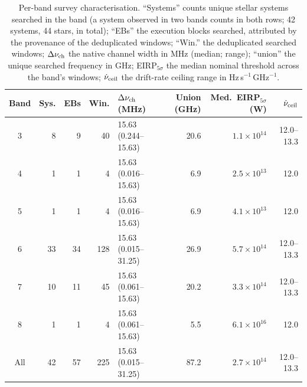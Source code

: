 \documentclass{openjournal}
\begin{document}
\begin{table}
\centering
\small
\setlength{\tabcolsep}{4pt}
\caption{Per-band survey characterisation. ``Systems'' counts unique
stellar systems searched in the band (a system observed in two bands
counts in both rows; 42 systems, 44 stars, in total); ``EBs'' the
execution blocks searched, attributed by the provenance of the
deduplicated windows; ``Win.'' the deduplicated searched windows;
$\Delta\nu_{\rm ch}$ the native channel width in MHz (median; range);
``union'' the unique searched frequency in GHz; EIRP$_{5\sigma}$ the
median nominal threshold across the band's windows; $\dot{\nu}_{\rm
ceil}$ the drift-rate ceiling range in
Hz\,s$^{-1}$\,GHz$^{-1}$.}
\label{tab:bands}
\begin{tabular}{@{}c r r r l r r r@{}}
\hline
Band & Sys. & EBs & Win. & $\Delta\nu_{\rm ch}$ (MHz) & Union (GHz) & Med.\ EIRP$_{5\sigma}$ (W) & $\dot{\nu}_{\rm ceil}$ \\
\hline
3 & 8 & 9 & 40 & 15.63 (0.244--15.63) & 20.6 & $1.1\times10^{14}$ & 12.0--13.3 \\
4 & 1 & 1 & 4 & 15.63 (0.016--15.63) & 6.9 & $2.5\times10^{13}$ & 12.0 \\
5 & 1 & 1 & 4 & 15.63 (0.016--15.63) & 6.9 & $4.1\times10^{13}$ & 12.0 \\
6 & 33 & 34 & 128 & 15.63 (0.015--31.25) & 26.9 & $5.7\times10^{14}$ & 12.0--13.3 \\
7 & 10 & 11 & 45 & 15.63 (0.061--15.63) & 20.2 & $3.3\times10^{14}$ & 12.0--13.3 \\
8 & 1 & 1 & 4 & 15.63 (0.061--15.63) & 5.5 & $6.1\times10^{16}$ & 12.0 \\
\hline
All & 42 & 57 & 225 & 15.63 (0.015--31.25) & 87.2 & $2.7\times10^{14}$ & 12.0--13.3 \\
\hline
\end{tabular}
\end{table}
\end{document}
